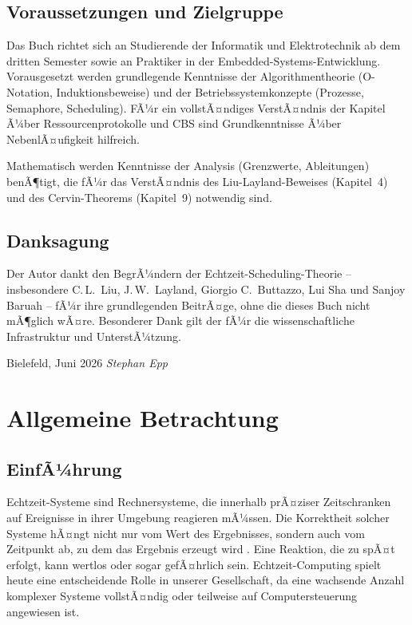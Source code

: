 ﻿\documentclass[a4paper,12pt]{report}
\theoremstyle{definition}
\begin{document}
\section*{Voraussetzungen und Zielgruppe}

Das Buch richtet sich an Studierende der Informatik und Elektrotechnik ab dem
dritten Semester sowie an Praktiker in der Embedded-Systems-Entwicklung.
Vorausgesetzt werden grundlegende Kenntnisse der Algorithmentheorie (O-Notation,
Induktionsbeweise) und der Betriebssystemkonzepte (Prozesse, Semaphore,
Scheduling). FÃ¼r ein vollstÃ¤ndiges VerstÃ¤ndnis der Kapitel Ã¼ber Ressourcenprotokolle
und CBS sind Grundkenntnisse Ã¼ber NebenlÃ¤ufigkeit hilfreich.

Mathematisch werden Kenntnisse der Analysis (Grenzwerte, Ableitungen) benÃ¶tigt,
die fÃ¼r das VerstÃ¤ndnis des Liu-Layland-Beweises (Kapitel~4) und des
Cervin-Theorems (Kapitel~9) notwendig sind.

\section*{Danksagung}

Der Autor dankt den BegrÃ¼ndern der Echtzeit-Scheduling-Theorie -- insbesondere
C.\,L.\ Liu, J.\,W.\ Layland, Giorgio C.\ Buttazzo, Lui Sha und Sanjoy Baruah --
fÃ¼r ihre grundlegenden BeitrÃ¤ge, ohne die dieses Buch nicht mÃ¶glich wÃ¤re.
Besonderer Dank gilt der fÃ¼r die wissenschaftliche
Infrastruktur und UnterstÃ¼tzung.

\bigskip
\noindent Bielefeld, Juni 2026 \hfill \textit{Stephan Epp}

\chapter{Allgemeine Betrachtung}
\label{chap:allgemein}

\section{EinfÃ¼hrung}

Echtzeit-Systeme sind Rechnersysteme, die innerhalb prÃ¤ziser Zeitschranken auf Ereignisse
in ihrer Umgebung reagieren mÃ¼ssen. Die Korrektheit solcher Systeme hÃ¤ngt nicht nur
vom Wert des Ergebnisses, sondern auch vom Zeitpunkt ab, zu dem das Ergebnis
erzeugt wird \cite{Stankovic1988}. Eine Reaktion, die zu spÃ¤t erfolgt, kann wertlos
oder sogar gefÃ¤hrlich sein. Echtzeit-Computing spielt heute eine entscheidende Rolle
in unserer Gesellschaft, da eine wachsende Anzahl komplexer Systeme vollstÃ¤ndig oder
teilweise auf Computersteuerung angewiesen ist.
\end{document}
